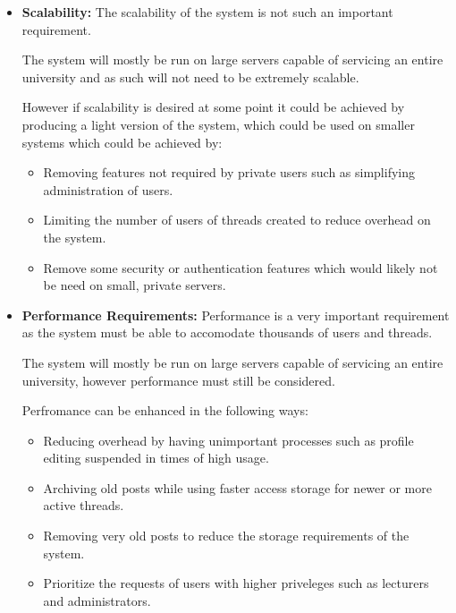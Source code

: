 
\begin{flushleft}
	\begin{itemize}
		\item \textbf{Scalability:} 
The scalability of the system is not such an important requirement.
\newline

The system will mostly be run on large servers capable of servicing an entire university and as such will not need to be extremely scalable.
\newline

However if scalability is desired at some point it could be achieved by producing a light version of the system, which could be used on smaller systems which could be achieved by:
\begin{itemize}
\item Removing features not required by private users such as simplifying administration of users.
\item Limiting the number of users of threads created to reduce overhead on the system.
\item Remove some security or authentication features which would likely not be need on small, private servers.

\end{itemize}
		\item \textbf{Performance Requirements:} 
Performance is a very important requirement as the system must be able to accomodate thousands of users and threads.
\newline

The system will mostly be run on large servers capable of servicing an entire university, however performance must still be considered.
\newline

Perfromance can be enhanced in the following ways:
\begin{itemize}
\item Reducing overhead by having unimportant processes such as profile editing suspended in times of high usage.
\item Archiving old posts while using faster access storage for newer or more active threads.
\item Removing very old posts to reduce the storage requirements of the system.
\item Prioritize the requests of users with higher priveleges such as lecturers and administrators.


\end{itemize}
\end{itemize}
\end{flushleft}

